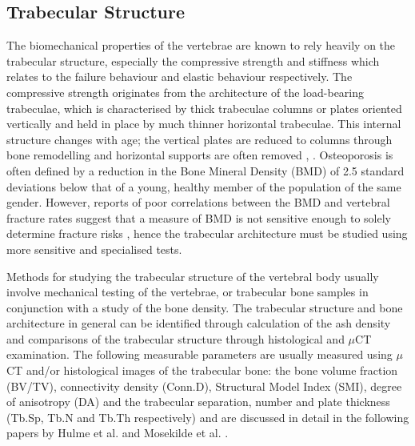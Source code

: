\subsection{Trabecular Structure }\label{trabecular-structure}

The biomechanical properties of the vertebrae are known to rely heavily
on the trabecular structure, especially the compressive strength and
stiffness which relates to the failure behaviour and elastic behaviour
respectively. The compressive strength originates from the architecture
of the load-bearing trabeculae, which is characterised by thick
trabeculae columns or plates oriented vertically and held in place by
much thinner horizontal trabeculae. This internal structure changes with
age; the vertical plates are reduced to columns through bone remodelling
and horizontal supports are often removed \cite{atkinson1967variation},
\cite{parfitt1984age}.
Osteoporosis is often defined by a reduction in the Bone Mineral Density
(BMD) of 2.5 standard deviations below that of a young, healthy member
of the population of the same gender. However, reports of poor
correlations between the BMD and vertebral fracture rates suggest that a
measure of BMD is not sensitive enough to solely determine fracture
risks \cite{Aaron2000}, hence the trabecular architecture must be studied using
more sensitive and specialised tests.

Methods for studying the trabecular structure of the vertebral body
usually involve mechanical testing of the vertebrae, or trabecular bone
samples in conjunction with a study of the bone density. The trabecular
structure and bone architecture in general can be identified through
calculation of the ash density and comparisons of the trabecular
structure through histological and $\mu$CT examination. The following
measurable parameters are usually measured using $\mu$CT and/or histological
images of the trabecular bone: the bone volume fraction (BV/TV),
connectivity density (Conn.D), Structural Model Index (SMI), degree of
anisotropy (DA) and the trabecular separation, number and plate
thickness (Tb.Sp, Tb.N and Tb.Th respectively) and are discussed in
detail in the following papers by Hulme et al. \cite{hulme2007regional} and Mosekilde et al.
\cite{mosekilde1987biomechanical}.

